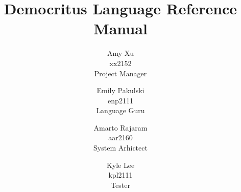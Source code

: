 \documentclass{report}
\author{
  Amy Xu \\ \small{xx2152} \\ \small{Project Manager} 
  \and Emily Pakulski \\ \small{enp2111} \\ \small{Language Guru} 
  \and Amarto Rajaram \\ \small{aar2160}  \\ \small{System Arhictect} 
  \and Kyle Lee\\ \small{kpl2111} \\ \small{Tester}
}
\title{Democritus Language Reference Manual}
\begin{document}
	\maketitle
	\tableofcontents
	\pagebreak
  
  
  
  
  
  
  
  
  
\end{document}
